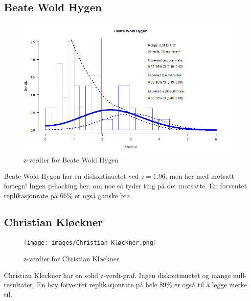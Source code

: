 \documentclass[doc,norsk]{apa7}
\begin{document}
\subsection{Beate Wold Hygen}
\begin{figure}[h!]
    \centering
    \includegraphics[width=\textwidth]{images/Beate Wold Hygen.png}
    \caption{z-verdier for Beate Wold Hygen}
\end{figure}
Beate Wold Hygen har en diskontinuetet ved $z=1.96$, men her med motsatt fortegn! Ingen p-hacking her, om noe så tyder ting på det motsatte. En forventet replikasjonrate på 66\% er også ganske bra.

\subsection{Christian Kløckner}
\begin{figure}[h!]
    \centering
    \texttt{[image: images/Christian Kløckner.png]}
    \caption{z-verdier for Christian Kløckner}
\end{figure}
Christian Kløckner har en solid z-verdi-graf. Ingen diskontinuetet og mange null-resultater. En høy forventet replikasjonrate på hele 89\% er også til å legge merke til.
\end{document}

